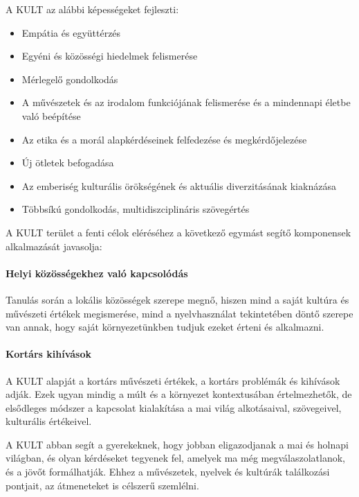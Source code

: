 A KULT az alábbi képességeket fejleszti:
\newpage
\begin{itemize}
\tightlist
\item
  Empátia és együttérzés
\item
  Egyéni és közösségi hiedelmek felismerése
\item
  Mérlegelő gondolkodás
\item
  A művészetek és az irodalom funkciójának felismerése és a mindennapi
  életbe való beépítése
\item
  Az etika és a morál alapkérdéseinek felfedezése és megkérdőjelezése
\item
  Új ötletek befogadása
\item
  Az emberiség kulturális örökségének és aktuális diverzitásának
  kiaknázása
\item
  Többsíkú gondolkodás, multidiszciplináris szövegértés
\end{itemize}

A KULT terület a fenti célok eléréséhez a következő egymást segítő
komponensek alkalmazását javasolja:

\hypertarget{helyi-kozossegekhez-valo-kapcsolodas}{%
\paragraph{Helyi közösségekhez való
kapcsolódás}\label{helyi-kozossegekhez-valo-kapcsolodas}}

Tanulás során a lokális közösségek szerepe megnő, hiszen mind a saját
kultúra és művészeti értékek megismerése, mind a nyelvhasználat
tekintetében döntő szerepe van annak, hogy saját környezetünkben tudjuk
ezeket érteni és alkalmazni.

\hypertarget{kortars-kihivasok}{%
\paragraph{Kortárs kihívások}\label{kortars-kihivasok}}

A KULT alapját a kortárs művészeti értékek, a kortárs problémák és
kihívások adják. Ezek ugyan mindig a múlt és a környezet kontextusában
értelmezhetők, de elsődleges módszer a kapcsolat kialakítása a mai világ
alkotásaival, szövegeivel, kulturális értékeivel.

A KULT abban segít a gyerekeknek, hogy jobban eligazodjanak a mai és
holnapi világban, és olyan kérdéseket tegyenek fel, amelyek ma még
megválaszolatlanok, és a jövőt formálhatják. Ehhez a művészetek, nyelvek
és kultúrák találkozási pontjait, az átmeneteket is célszerű szemlélni.

